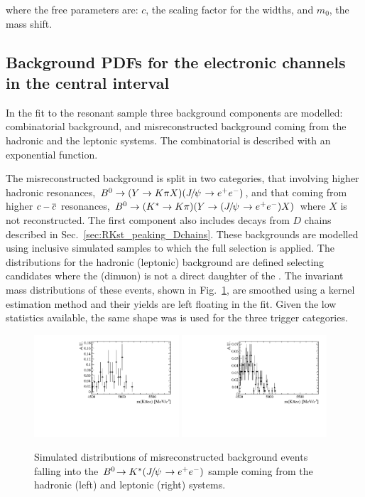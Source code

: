 where the free parameters are: $c$, the scaling factor for the widths, and $m_0$, the mass shift.

\subsection{Background PDFs for the electronic channels in the central \qsq interval}
\label{sec:RKst_misreco_fit}

In the fit to the resonant sample three background components are modelled:
combinatorial background, and misreconstructed background coming
from the hadronic and the leptonic systems. The combinatorial is described
with an exponential function.

The misreconstructed background is split in two categories,
that involving higher hadronic resonances, $\Bz\to (Y\to K\pi X) (\jpsi\to\epem)$,
and that coming from higher ${c}-{\overline {{c}}}$ resonances, $\Bz\to (\Kstar\to K\pi) (Y\to(\jpsi\to\epem)X)$
where $X$ is not reconstructed. The first component also includes decays from
$D$ chains described in Sec.~\ref{sec:RKst_peaking_Dchains}.
These backgrounds are modelled using inclusive  simulated samples to which the full
selection is applied. The distributions for the hadronic (leptonic) background are defined selecting
candidates where the \Kstar (dimuon) is not a direct daughter of the \Bz.
The invariant mass distributions of these events, shown in Fig.~\ref{fig:RKst_misreco_distrib},
are smoothed using a kernel estimation method and their yields are left floating in the fit.
Given the low statistics available, the same shape was is used for the three trigger categories.

\begin{figure}[h!]
\centering
\includegraphics[width=0.48\textwidth]{RKst/figs/misreco/part_had_jpsi.pdf}
\includegraphics[width=0.48\textwidth]{RKst/figs/misreco/part_lpt_jpsi.pdf}
\caption{Simulated distributions of misreconstructed background events falling into
the $\decay{\Bz}{\Kstar(\jpsi\to\ee)}$ sample coming from the
hadronic (left) and leptonic (right) systems.}
\label{fig:RKst_misreco_distrib}
\end{figure}

